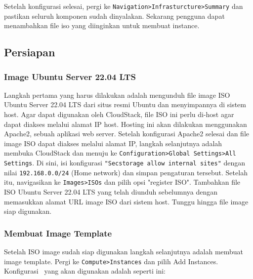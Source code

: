 Setelah konfigurasi selesai, pergi ke \texttt{Navigation>Infrasturcture>Summary} dan pastikan seluruh komponen sudah dinyalakan. Sekarang pengguna dapat menambahkan file iso yang diinginkan untuk membuat instance.

\subsection{Persiapan \vm}

\subsubsection{Image Ubuntu Server 22.04 LTS}
Langkah pertama yang harus dilakukan adalah mengunduh file image ISO Ubuntu Server 22.04 LTS dari situs resmi Ubuntu dan menyimpannya di sistem host. Agar dapat digunakan oleh CloudStack, file ISO ini perlu di-host agar dapat diakses melalui alamat IP host. Hosting ini akan dilakukan menggunakan Apache2, sebuah aplikasi web server. Setelah konfigurasi Apache2 selesai dan file image ISO dapat diakses melalui alamat IP, langkah selanjutnya adalah membuka CloudStack dan menuju ke \texttt{Configuration>Global Settings>All Settings}. Di sini, isi konfigurasi \texttt{"Secstorage allow internal sites"} dengan nilai \texttt{192.168.0.0/24} (Home network) dan simpan pengaturan tersebut. Setelah itu, navigasikan ke \texttt{Images>ISOs} dan pilih opsi "register ISO". Tambahkan file ISO Ubuntu Server 22.04 LTS yang telah diunduh sebelumnya dengan memasukkan alamat URL image ISO dari sistem host. Tunggu hingga file image siap digunakan.

\subsubsection{Membuat Image Template}
Setelah ISO image sudah siap digunakan langkah selanjutnya adalah membuat image template. Pergi ke \texttt{Compute>Instances} dan pilih Add Instances. Konfigurasi \vm\ yang akan digunakan adalah seperti ini:

